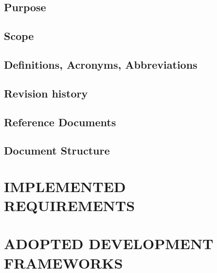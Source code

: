\documentclass[11pt]{report}
\begin{document}
		\section{Purpose}
		\label{sect:Purpose}
			
			
		\section{Scope}
		\label{sect:Scope}
			
			
		\section{Definitions, Acronyms, Abbreviations}
		\label{sect:Definitions, Acronyms, Abbreviations}
			
			
			
			
		\section{Revision history}
		\label{sect:Revision history}
			
			
		\section{Reference Documents}
		\label{sect:Documents}
			
			
		\section{Document Structure}
		\label{sect:Document Structure}
			
			
	\chapter{IMPLEMENTED REQUIREMENTS}
	\label{ch:IMPLEMENTED REQUIREMENTS}
		
			
	\chapter{ADOPTED DEVELOPMENT FRAMEWORKS}
	\label{ch:ADOPTED DEVELOPMENT FRAMEWORKS}
		
	
\end{document}
